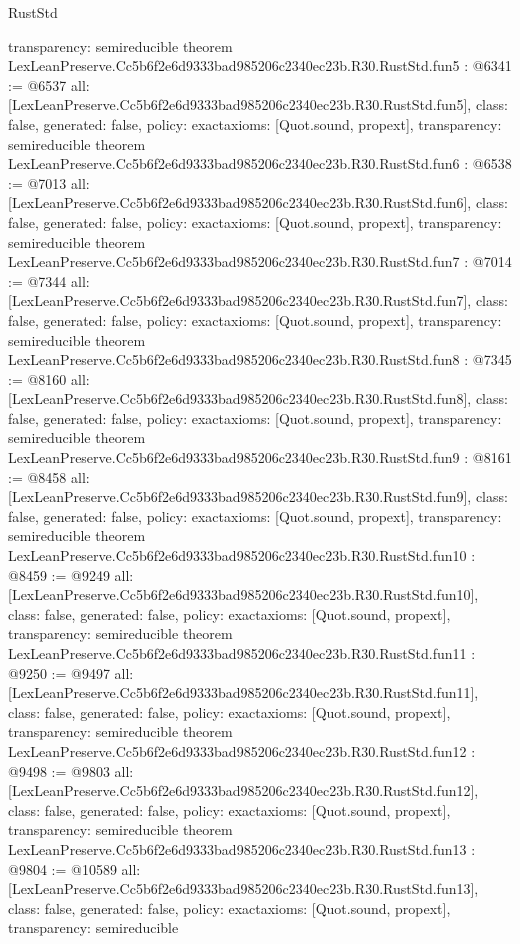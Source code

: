 \begin{lexlean}{RustStd}
\begin{coremodule}
{  transparency: semireducible
}
theorem LexLeanPreserve.Cc5b6f2e6d9333bad985206c2340ec23b.R30.RustStd.fun5 : @6341 := @6537 {
  all: [LexLeanPreserve.Cc5b6f2e6d9333bad985206c2340ec23b.R30.RustStd.fun5],
  class: false,
  generated: false,
  policy: exact{axioms: [Quot.sound, propext]},
  transparency: semireducible
}
theorem LexLeanPreserve.Cc5b6f2e6d9333bad985206c2340ec23b.R30.RustStd.fun6 : @6538 := @7013 {
  all: [LexLeanPreserve.Cc5b6f2e6d9333bad985206c2340ec23b.R30.RustStd.fun6],
  class: false,
  generated: false,
  policy: exact{axioms: [Quot.sound, propext]},
  transparency: semireducible
}
theorem LexLeanPreserve.Cc5b6f2e6d9333bad985206c2340ec23b.R30.RustStd.fun7 : @7014 := @7344 {
  all: [LexLeanPreserve.Cc5b6f2e6d9333bad985206c2340ec23b.R30.RustStd.fun7],
  class: false,
  generated: false,
  policy: exact{axioms: [Quot.sound, propext]},
  transparency: semireducible
}
theorem LexLeanPreserve.Cc5b6f2e6d9333bad985206c2340ec23b.R30.RustStd.fun8 : @7345 := @8160 {
  all: [LexLeanPreserve.Cc5b6f2e6d9333bad985206c2340ec23b.R30.RustStd.fun8],
  class: false,
  generated: false,
  policy: exact{axioms: [Quot.sound, propext]},
  transparency: semireducible
}
theorem LexLeanPreserve.Cc5b6f2e6d9333bad985206c2340ec23b.R30.RustStd.fun9 : @8161 := @8458 {
  all: [LexLeanPreserve.Cc5b6f2e6d9333bad985206c2340ec23b.R30.RustStd.fun9],
  class: false,
  generated: false,
  policy: exact{axioms: [Quot.sound, propext]},
  transparency: semireducible
}
theorem LexLeanPreserve.Cc5b6f2e6d9333bad985206c2340ec23b.R30.RustStd.fun10 : @8459 := @9249 {
  all: [LexLeanPreserve.Cc5b6f2e6d9333bad985206c2340ec23b.R30.RustStd.fun10],
  class: false,
  generated: false,
  policy: exact{axioms: [Quot.sound, propext]},
  transparency: semireducible
}
theorem LexLeanPreserve.Cc5b6f2e6d9333bad985206c2340ec23b.R30.RustStd.fun11 : @9250 := @9497 {
  all: [LexLeanPreserve.Cc5b6f2e6d9333bad985206c2340ec23b.R30.RustStd.fun11],
  class: false,
  generated: false,
  policy: exact{axioms: [Quot.sound, propext]},
  transparency: semireducible
}
theorem LexLeanPreserve.Cc5b6f2e6d9333bad985206c2340ec23b.R30.RustStd.fun12 : @9498 := @9803 {
  all: [LexLeanPreserve.Cc5b6f2e6d9333bad985206c2340ec23b.R30.RustStd.fun12],
  class: false,
  generated: false,
  policy: exact{axioms: [Quot.sound, propext]},
  transparency: semireducible
}
theorem LexLeanPreserve.Cc5b6f2e6d9333bad985206c2340ec23b.R30.RustStd.fun13 : @9804 := @10589 {
  all: [LexLeanPreserve.Cc5b6f2e6d9333bad985206c2340ec23b.R30.RustStd.fun13],
  class: false,
  generated: false,
  policy: exact{axioms: [Quot.sound, propext]},
  transparency: semireducible
}
\end{coremodule}
\end{lexlean}
